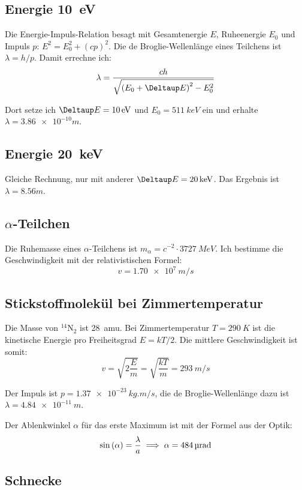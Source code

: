 \subsection{Energie \SI{10}{eV}}

Die Energie-Impuls-Relation besagt mit Gesamtenergie $E$, Ruheenergie $E_0$ und
Impuls $p$: $E^2 = E_0^2 + (cp)^2$. Die de Broglie-Wellenlänge eines Teilchens
ist $\lambda = h/p$. Damit errechne ich:
\[
	\lambda = \frac{ch}{\sqrt{\del{E_0 + \Deltaup E}^2 - E_0^2}}
\]

Dort setze ich $\Deltaup E = \SI{10}{eV}$ und $E_0 = \SI{511}{keV}$ ein und
erhalte $\lambda = \SI{3.86e-10}m$.

\subsection{Energie \SI{20}{keV}}

Gleiche Rechnung, nur mit anderer $\Deltaup E = \SI{20}{keV}$. Das Ergebnis ist
$\lambda = \SI{8.56}m$.

\subsection{$\alpha$-Teilchen}

Die Ruhemasse eines $\alpha$-Teilchens ist $m_\alpha = c^{-2} \cdot
\SI{3727}{MeV}$. Ich bestimme die Geschwindigkeit mit der relativistischen
Formel:
\[
	v = \SI{1.70e7}{m/s}
\]

\subsection{Stickstoffmolekül bei Zimmertemperatur}

Die Masse von $\mathrm{^{14}N_2}$ ist \SI{28}{amu}. Bei Zimmertemperatur $T = \SI{290}{K}$ ist die kinetische Energie pro Freiheitsgrad $E = kT/2$. Die mittlere Geschwindigkeit ist somit:
\[
	v
	= \sqrt{2 \frac Em}
	= \sqrt{\frac{kT}m}
	= \SI{293}{m/s}
\]

Der Impuls ist $p = \SI{1.37e-23}{kg.m/s}$, die de Broglie-Wellenlänge dazu ist
$\lambda = \SI{4.84e-11}{m}$.

Der Ablenkwinkel $\alpha$ für das erste Maximum ist mit der Formel aus der Optik:
\[
	\sin\del\alpha = \frac{\lambda}{a}
	\implies
	\alpha = \SI{484}{\micro rad}
\]

\subsection{Schnecke}

